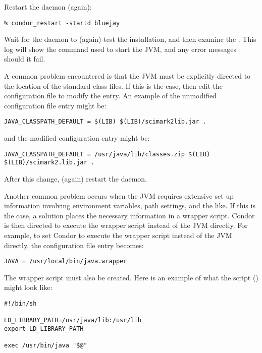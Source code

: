 Restart the  daemon (again):
\begin{verbatim}
% condor_restart -startd bluejay
\end{verbatim}

Wait for the  daemon to (again) test the installation,
and then examine the .
This log will show the command used to start the JVM, and
any error messages should it fail.


A common problem encountered is that the JVM
must be explicitly directed to the location
of the standard class files.
If this is the case, then
edit the configuration file to modify the
 entry.
An example of the unmodified configuration file entry might be:
\begin{verbatim}
JAVA_CLASSPATH_DEFAULT = $(LIB) $(LIB)/scimark2lib.jar .
\end{verbatim}
and the modified configuration entry might be:
\begin{verbatim}
JAVA_CLASSPATH_DEFAULT = /usr/java/lib/classes.zip $(LIB) $(LIB)/scimark2.lib.jar .
\end{verbatim}
After this change, (again) restart the  daemon.


Another common problem occurs when the JVM requires extensive 
set up information involving environment variables, path settings,
and the like.
If this is the case, a solution places
the necessary information in a wrapper script.
Condor is then directed to
execute the wrapper script instead of the JVM directly.
For example, to set Condor to execute the wrapper script instead
of the JVM directly, the  configuration
file entry becomes:

\begin{verbatim}
JAVA = /usr/local/bin/java.wrapper
\end{verbatim}

The wrapper script must also be created.
Here is an example of what the script ()
might look like:

\begin{verbatim}
#!/bin/sh

LD_LIBRARY_PATH=/usr/java/lib:/usr/lib
export LD_LIBRARY_PATH

exec /usr/bin/java "$@"
\end{verbatim}
